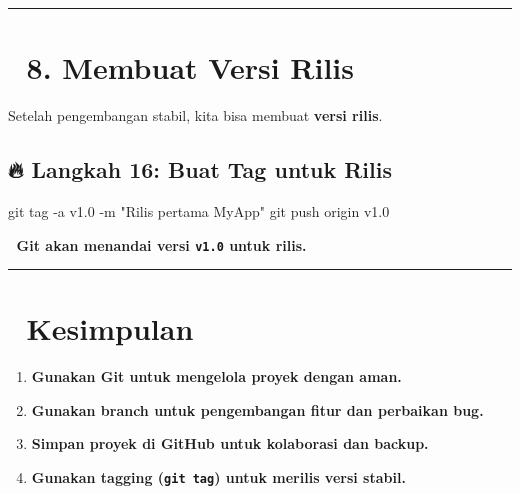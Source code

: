 \documentclass[
  letterpaper,
  DIV=11,
  numbers=noendperiod]{scrreprt}
\newenvironment{Shaded}{\begin{snugshade}}{\end{snugshade}}
\newcommand{\AttributeTok}[1]{\textcolor[rgb]{0.40,0.45,0.13}{#1}}
\newcommand{\FunctionTok}[1]{\textcolor[rgb]{0.28,0.35,0.67}{#1}}
\newcommand{\NormalTok}[1]{\textcolor[rgb]{0.00,0.23,0.31}{#1}}
\newcommand{\StringTok}[1]{\textcolor[rgb]{0.13,0.47,0.30}{#1}}
\providecommand{\tightlist}{%
  \setlength{\itemsep}{0pt}\setlength{\parskip}{0pt}}\usepackage{longtable,booktabs,array}
\begin{document}
\begin{center}\rule{0.5\linewidth}{0.5pt}\end{center}

\section{\texorpdfstring{🔹 \textbf{8. Membuat Versi
Rilis}}{🔹 8. Membuat Versi Rilis}}\label{membuat-versi-rilis}

Setelah pengembangan stabil, kita bisa membuat \textbf{versi rilis}.

\subsection{\texorpdfstring{🔥 \textbf{Langkah 16: Buat Tag untuk
Rilis}}{🔥 Langkah 16: Buat Tag untuk Rilis}}\label{langkah-16-buat-tag-untuk-rilis}

\begin{Shaded}
\begin{Highlighting}[]
\FunctionTok{git}\NormalTok{ tag }\AttributeTok{{-}a}\NormalTok{ v1.0 }\AttributeTok{{-}m} \StringTok{"Rilis pertama MyApp"}
\FunctionTok{git}\NormalTok{ push origin v1.0}
\end{Highlighting}
\end{Shaded}

📌 \textbf{Git akan menandai versi \texttt{v1.0} untuk rilis.}

\begin{center}\rule{0.5\linewidth}{0.5pt}\end{center}

\section{\texorpdfstring{🎯
\textbf{Kesimpulan}}{🎯 Kesimpulan}}\label{kesimpulan-1}

\begin{enumerate}
\def\labelenumi{\arabic{enumi}.}
\tightlist
\item
  \textbf{Gunakan Git untuk mengelola proyek dengan aman.}\\
\item
  \textbf{Gunakan branch untuk pengembangan fitur dan perbaikan bug.}\\
\item
  \textbf{Simpan proyek di GitHub untuk kolaborasi dan backup.}\\
\item
  \textbf{Gunakan tagging (\texttt{git\ tag}) untuk merilis versi
  stabil.}
\end{enumerate}
\end{document}
